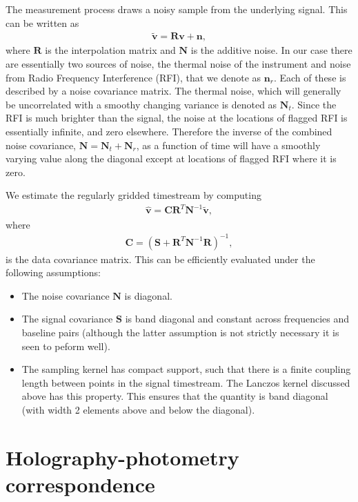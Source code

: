 The measurement process draws a noisy sample from the underlying signal. This
can be written as 
\begin{align}
\tilde{\mathbf{v}} = \mathbf{R}\mathbf{v} + \mathbf{n},
\end{align}
where $\mathbf{R}$ is the interpolation matrix and $\mathbf{N}$ is the additive noise. In our case there are essentially two sources of noise, the thermal noise of the instrument and noise from
Radio Frequency Interference (RFI), that we denote as $\mathbf{n}_r$. Each of these is described
by a noise covariance matrix. The thermal noise, which will generally be uncorrelated with a smoothy changing variance is denoted as $\mathbf{N}_t$. Since the RFI is much brighter than the signal, the noise at the locations of flagged RFI is essentially infinite, and zero elsewhere. Therefore the inverse of the combined noise covariance, $\mathbf{N} = \mathbf{N}_t + \mathbf{N}_r$, as a function of time will have a smoothly varying value along the diagonal except at locations of flagged RFI where it is zero.

We estimate the regularly gridded timestream by computing
\begin{align}
\hat{\mathbf{v}} = \mathbf{CR}^T \mathbf{N}^{-1} \tilde{\mathbf{v}},
\end{align}
where
\begin{align}
\mathbf{C} = (\mathbf{S} + \mathbf{R}^T \mathbf{N}^{-1} \mathbf{R})^{-1},
\end{align}
is the data covariance matrix. This can be efficiently evaluated under the following assumptions:
\begin{itemize}
\item The noise covariance $\mathbf{N}$ is diagonal.
\item The signal covariance $\mathbf{S}$ is band diagonal and constant across frequencies and baseline pairs (although the latter assumption is not strictly necessary it is seen to peform well).
\item The sampling kernel has compact support, such that there is a finite coupling
length between points in the signal timestream. The Lanczos kernel discussed
above has this property. This ensures that the quantity is band diagonal (with width 2 elements above and below the diagonal).
\end{itemize}

\section{Holography-photometry correspondence}
\label{app:hol:sec:photometry}

